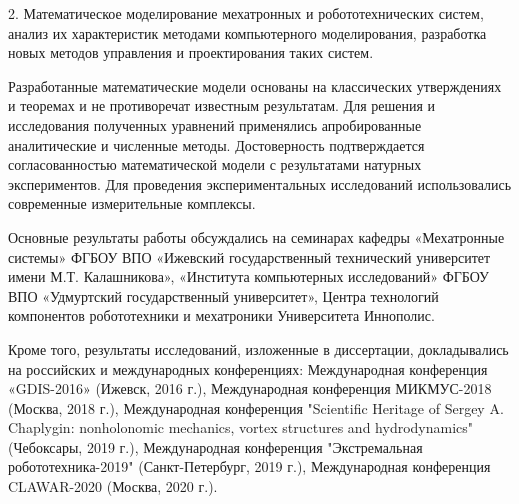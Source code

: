 2. Математическое моделирование мехатронных и робототехнических систем, анализ их характеристик методами компьютерного моделирования, разработка новых методов управления и проектирования таких систем.

{\reliability} Разработанные математические модели основаны на классических утверждениях и теоремах и не противоречат известным результатам. Для решения и исследования полученных уравнений применялись апробированные аналитические и численные методы. Достоверность подтверждается согласованностью математической модели с результатами натурных экспериментов. Для проведения экспериментальных исследований использовались современные измерительные комплексы.


{\probation}
Основные результаты работы обсуждались на семинарах кафедры «Мехатронные системы» ФГБОУ ВПО «Ижевский государственный технический университет имени М.Т. Калашникова», «Института компьютерных исследований» ФГБОУ ВПО «Удмуртский государственный университет», Центра технологий компонентов робототехники и мехатроники Университета Иннополис.

Кроме того, результаты исследований, изложенные в диссертации, докладывались на российских и международных конференциях:
Международная конференция «GDIS-2016» (Ижевск, 2016 г.), Международная конференция МИКМУС-2018 (Москва, 2018 г.), Международная конференция "Scientific Heritage of Sergey A. Chaplygin: nonholonomic mechanics, vortex structures and hydrodynamics" (Чебоксары, 2019 г.), Международная конференция "Экстремальная робототехника-2019" (Санкт-Петербург, 2019 г.), Международная конференция CLAWAR-2020 (Москва, 2020 г.).

%	
%	
%	
%	

